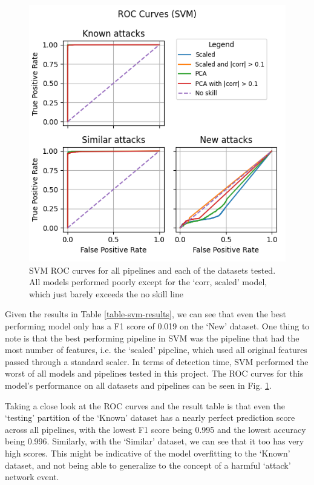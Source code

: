 \begin{figure}
    \centering
    \includegraphics[width=\linewidth]{figures/SVM_roc_all_small.png}
    \caption{SVM ROC curves for all pipelines and each of the datasets tested. All models performed poorly except for the `corr, scaled' model, which just barely exceeds the no skill line}
    \label{fig:svm-roc}
\end{figure}

Given the results in Table \ref{table-svm-results}, we can see that even the best performing model only has a F1 score of 0.019 on the `New' dataset. One thing to note is that the best performing pipeline in SVM was the pipeline that had the most number of features, i.e. the `scaled' pipeline, which used all original features passed through a standard scaler. In terms of detection time, SVM performed the worst of all models and pipelines tested in this project. The ROC curves for this model's performance on all datasets and pipelines can be seen in Fig. \ref{fig:svm-roc}. 

Taking a close look at the ROC curves and the result table is that even the `testing' partition of the `Known' dataset has a nearly perfect prediction score across all pipelines, with the lowest F1 score being 0.995 and the lowest accuracy being 0.996. Similarly, with the `Similar' dataset, we can see that it too has very high scores. This might be indicative of the model overfitting to the `Known' dataset, and not being able to generalize to the concept of a harmful `attack' network event. 

